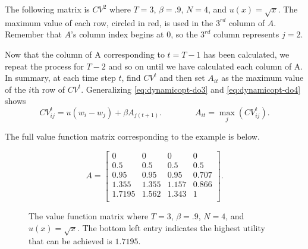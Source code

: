 The following matrix is $CV^{2}$ where $T=3$, $\beta = .9$, $N=4$, and $u(x) = \sqrt{x}$.
The maximum value of each row, circled in red, is used in the $3^{rd}$ column of $A$.
Remember that $A$'s column index begins at $0$, so the $3^{rd}$ column represents $j=2$.

\begin{center}
\end{center}

Now that the column of A corresponding to $t = T-1$ has been calculated, we repeat the process for $T-2$ and so on until we have calculated each column of A.
In summary, at each time step $t$, find $CV^t$ and then set $A_{it}$ as the maximum value of the $i$th row of $CV^t$.
Generalizing \eqref{eq:dynamicopt-do3} and \eqref{eq:dynamicopt-do4} shows
\begin{equation}\label{eq:dynamicopt-do5}
CV^{t}_{ij} = u(w_i - w_j) + \beta A_{j(t+1)}.
\qquad \qquad
A_{it} = \max_{j} \left(CV_{ij}^t \right).
\end{equation}

The full value function matrix corresponding to the example is below.

\begin{figure}[H]
\[
A =
\begin{bmatrix}
0 & 0 & 0 & 0 \\
0.5 & 0.5 & 0.5 & 0.5 \\
0.95 & 0.95 & 0.95 & 0.707 \\
1.355 & 1.355 & 1.157 & 0.866 \\
1.7195 & 1.562 & 1.343 & 1 \\
\end{bmatrix}
.
\]
\caption{The value function matrix where $T=3$, $\beta=.9$, $N=4$, and $u(x) = \sqrt{x}$. The bottom left entry indicates the highest utility that can be achieved is $1.7195$.}
\label{fig:2nd_val_func_matrix}
\end{figure}

